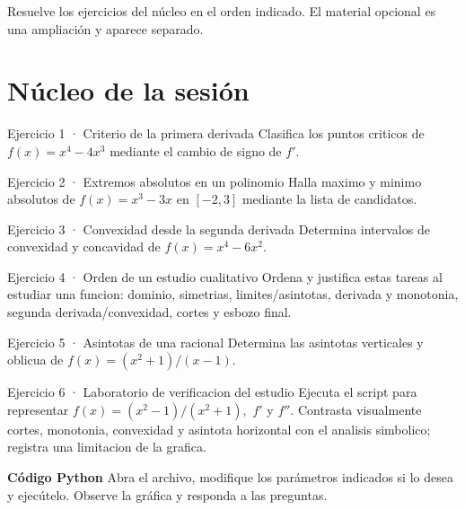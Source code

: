 \documentclass[10pt,a4paper,oneside,openany]{book}
\begin{document}
Resuelve los ejercicios del núcleo en el orden indicado. El material opcional es una ampliación y aparece separado.
\section*{Núcleo de la sesión}
\begin{PSevenExerciseFixed}{Ejercicio 1 · Criterio de la primera derivada}
Clasifica los puntos criticos de \(f(x)=x^{4}-4x^{3}\) mediante el cambio de signo de \(f'\).
\end{PSevenExerciseFixed}
\begin{PSevenExerciseFixed}{Ejercicio 2 · Extremos absolutos en un polinomio}
Halla maximo y minimo absolutos de \(f(x)=x^{3}-3x\) en \([-2,3]\) mediante la lista de candidatos.
\end{PSevenExerciseFixed}
\begin{PSevenExerciseFixed}{Ejercicio 3 · Convexidad desde la segunda derivada}
Determina intervalos de convexidad y concavidad de \(f(x)=x^{4}-6x^{2}\).
\end{PSevenExerciseFixed}
\begin{PSevenExerciseFixed}{Ejercicio 4 · Orden de un estudio cualitativo}
Ordena y justifica estas tareas al estudiar una funcion: dominio, simetrias, limites/asintotas, derivada y monotonia, segunda derivada/convexidad, cortes y esbozo final.
\end{PSevenExerciseFixed}
\begin{PSevenExerciseFixed}{Ejercicio 5 · Asintotas de una racional}
Determina las asintotas verticales y oblicua de \(f(x)=(x^{2}+1)/(x-1)\).
\end{PSevenExerciseFixed}
\begin{PSevenExercise}{Ejercicio 6 · Laboratorio de verificacion del estudio}
Ejecuta el script para representar \(f(x)=(x^{2}-1)/(x^{2}+1),\) \(f'\) y \(f''\). Contrasta visualmente cortes, monotonia, convexidad y asintota horizontal con el analisis simbolico; registra una limitacion de la grafica.
\par\medskip\textbf{Código Python}
Abra el archivo, modifique los parámetros indicados si lo desea y
ejecútelo. Observe la gráfica y responda a las preguntas.\par\smallskip
{}
\end{PSevenExercise}
\end{document}
